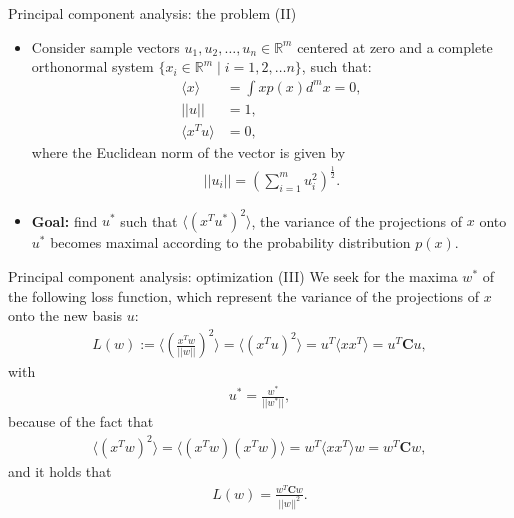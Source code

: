 \documentclass[aspectratio=169,t]{beamer}
\begin{document}
  {
    \begin{frame}{Principal component analysis: the problem (II)}
    \begin{itemize}
    \item Consider sample vectors $u_1, u_2, \ldots, u_n \in \mathbb{R}^m$ centered at zero and a complete orthonormal system $\{x_i \in \mathbb{R}^m \; \vert \; i = 1, 2, \ldots n\}$, such that:
    \begin{align}
      \langle x \rangle &= \int x p(x) d^m x = 0,\\
      \vert\vert u \vert\vert &= 1,\\
      \langle x^{T}u \rangle &= 0,
    \end{align}
    where the Euclidean norm of the vector is given by
    \begin{align}
      \vert\vert u_i \vert\vert = \left(\sum_{i=1}^{m} u_i^2\right)^\frac{1}{2}.
    \end{align}
      \item \textbf{Goal:} find $u^*$ such that $\langle (x^{T}u^*)^2 \rangle$, the variance of the projections of $x$ onto $u^*$ becomes maximal according to the probability distribution $p(x)$.
    \end{itemize}
    \end{frame}
  }

  {
    \begin{frame}{Principal component analysis: optimization (III)}
    We seek for the maxima $w^*$ of the following loss function, which represent the variance of the projections of $x$ onto the new basis $u$:
    \begin{align}
      L(w) := \langle (\frac{x^Tw}{\vert\vert w \vert\vert})^2 \rangle = \langle (x^Tu)^2 \rangle = u^T \langle xx^T \rangle = u^T \mathbf{C} u,
    \end{align}
    with
    \begin{align}
      u^* = \frac{w^*}{\vert\vert w^* \vert\vert},
    \end{align}
    because of the fact that
    \begin{align}
      \langle (x^Tw)^2 \rangle = \langle (x^Tw)(x^Tw) \rangle = w^T\langle xx^T \rangle w = w^T \mathbf{C}w,
    \end{align}
    and it holds that
    \begin{align}
      L(w) = \frac{w^T \mathbf{C} w}{\vert\vert w \vert\vert^2}.
    \end{align}
    \end{frame}
  }
\end{document}
